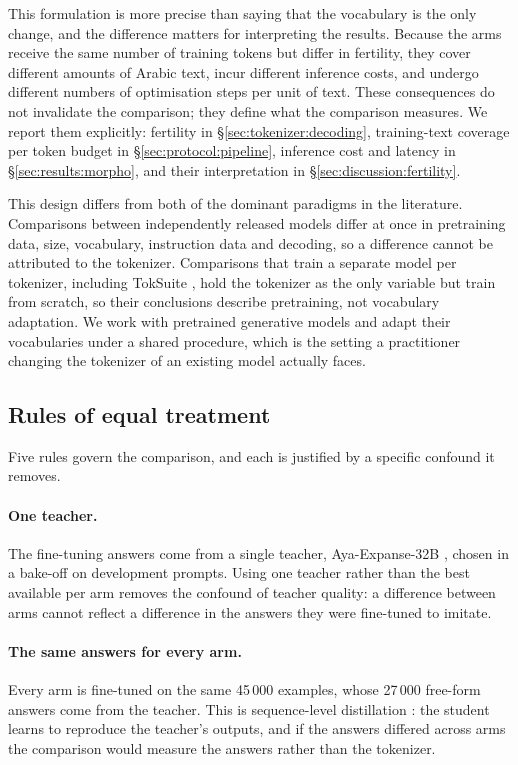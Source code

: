 \documentclass[a4paper,fleqn]{cas-sc}
\begin{document}
This formulation is more precise than saying that the vocabulary is the only change, and the difference matters for interpreting the results. Because the arms receive the same number of training tokens but differ in fertility, they cover different amounts of Arabic text, incur different inference costs, and undergo different numbers of optimisation steps per unit of text. These consequences do not invalidate the comparison; they define what the comparison measures. We report them explicitly: fertility in \S\ref{sec:tokenizer:decoding}, training-text coverage per token budget in \S\ref{sec:protocol:pipeline}, inference cost and latency in \S\ref{sec:results:morpho}, and their interpretation in \S\ref{sec:discussion:fertility}.

This design differs from both of the dominant paradigms in the literature. Comparisons between independently released models differ at once in pretraining data, size, vocabulary, instruction data and decoding, so a difference cannot be attributed to the tokenizer. Comparisons that train a separate model per tokenizer, including TokSuite \citep{altintas2025toksuite}, hold the tokenizer as the only variable but train from scratch, so their conclusions describe pretraining, not vocabulary adaptation. We work with pretrained generative models and adapt their vocabularies under a shared procedure, which is the setting a practitioner changing the tokenizer of an existing model actually faces.

\subsection{Rules of equal treatment}
\label{sec:protocol:rules}

Five rules govern the comparison, and each is justified by a specific confound it removes.

\paragraph{One teacher.} The fine-tuning answers come from a single teacher, Aya-Expanse-32B \citep{dang2024aya}, chosen in a bake-off on development prompts. Using one teacher rather than the best available per arm removes the confound of teacher quality: a difference between arms cannot reflect a difference in the answers they were fine-tuned to imitate.

\paragraph{The same answers for every arm.} Every arm is fine-tuned on the same 45\,000 examples, whose 27\,000 free-form answers come from the teacher. This is sequence-level distillation \citep{kim2016sequence}: the student learns to reproduce the teacher's outputs, and if the answers differed across arms the comparison would measure the answers rather than the tokenizer.
\end{document}

